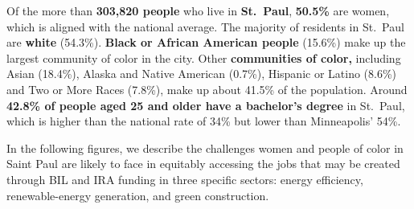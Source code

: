 \documentclass[
  letterpaper,
  DIV=11,
  numbers=noendperiod]{scrartcl}
\begin{document}
\begin{tcolorbox}[enhanced jigsaw, coltitle=black, opacitybacktitle=0.6, rightrule=.15mm, colframe=quarto-callout-note-color-frame, bottomtitle=1mm, title=\textcolor{quarto-callout-note-color}{\faInfo}\hspace{0.5em}{RQ 4: Who is getting these green jobs, based on education,
race/ethnicity, gender, and income levels in the City of Saint Paul?}, breakable, colback=white, toptitle=1mm, titlerule=0mm, arc=.35mm, opacityback=0, left=2mm, bottomrule=.15mm, toprule=.15mm, colbacktitle=quarto-callout-note-color!10!white, leftrule=.75mm]

Of the more than \textbf{303,820 people} who live in \textbf{St.~Paul},
\textbf{50.5\%} are women, which is aligned with the national average.
The majority of residents in St.~Paul are \textbf{white} (54.3\%).
\textbf{Black or African American people} (15.6\%) make up the largest
community of color in the city. Other \textbf{communities of color,}
including Asian (18.4\%), Alaska and Native American (0.7\%), Hispanic
or Latino (8.6\%) and Two or More Races (7.8\%), make up about 41.5\% of
the population. Around \textbf{42.8\% of people aged 25 and older have a
bachelor's degree} in St.~Paul, which is higher than the national rate
of 34\% but lower than Minneapolis' 54\%.

\end{tcolorbox}

In the following figures, we describe the challenges women and people of
color in Saint Paul are likely to face in equitably accessing the jobs
that may be created through BIL and IRA funding in three specific
sectors: energy efficiency, renewable-energy generation, and green
construction.
\end{document}
